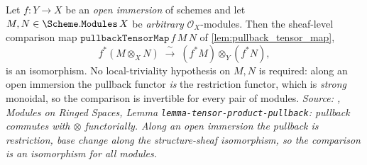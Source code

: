 \begin{lemma}\leanok
  \label{lem:pullback_tensor_map_isiso_open_immersion}
  Let \(f : Y \to X\) be an \emph{open immersion} of schemes and let
  \(M, N \in \Scheme.\mathtt{Modules}\,X\) be \emph{arbitrary} \(\mathcal{O}_X\)-modules.
  Then the sheaf-level comparison map \(\mathtt{pullbackTensorMap}\,f\,M\,N\) of
  \cref{lem:pullback_tensor_map},
  \[
    f^*(M \otimes_X N)
      \;\xrightarrow{\;\sim\;}\;
    (f^*M) \otimes_Y (f^*N),
  \]
  is an isomorphism. No local-triviality hypothesis on \(M, N\) is required: along an open
  immersion the pullback functor \emph{is} the restriction functor, which is \emph{strong}
  monoidal, so the comparison is invertible for every pair of modules.
  \textit{Source: \cite{stacks-project}, Modules on Ringed Spaces, Lemma
  \texttt{lemma-tensor-product-pullback}: pullback commutes with \(\otimes\) functorially.
  Along an open immersion the pullback is restriction, base change along the structure-sheaf
  \emph{isomorphism}, so the comparison is an isomorphism for all modules.}
\end{lemma}

